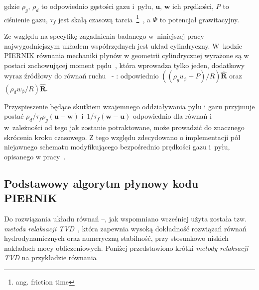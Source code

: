 \noindent gdzie $\rho_g$, $\rho_d$ to odpowiednio gęstości gazu i~pyłu,
$\mathbf{u}$, $\mathbf{w}$ ich prędkości, $P$ to ciśnienie gazu, $\tau_f$ jest
skalą czasową tarcia~\footnote{ang. friction time}~, a $\Phi$ to
potencjał grawitacyjny.

\par Ze względu na specyfikę zagadnienia badanego w~niniejszej pracy
najwygodniejszym układem współrzędnych jest układ cylindryczny. W~kodzie PIERNIK
równania mechaniki płynów w geometrii cylindrycznej wyrażone są w postaci
zachowującej moment pędu~\cite{M07,SO10}, która wprowadza tylko jeden, dodatkowy
wyraz źródłowy do równań ruchu~ - : odpowiednio
$\left((\rho_g u_\phi + P) / R\right)\mathbf{\hat{R}}$ oraz $(\rho_d w_\phi / R)
\mathbf{\hat{R}}$.
%
\par Przyspieszenie będące skutkiem wzajemnego oddziaływania pyłu i gazu
przyjmuje postać $\rho_d/\tau_f\rho_g(\mathbf{u}-\mathbf{w})$
i~$1/\tau_f(\mathbf{w}-\mathbf{u})$ odpowiednio dla równań 
i~ w~zależności od tego jak zostanie potraktowane, może prowadzić do
znacznego skrócenia kroku czasowego. Z tego względu zdecydowano o implementacji
pół niejawnego schematu modyfikującego bezpośrednio prędkości gazu i~pyłu,
opisanego w pracy~\cite{TB09}.

%

\subsection{Podstawowy algorytm płynowy kodu PIERNIK}
Do rozwiązania układu równań --, jak wspomniano wcześniej
użyta została tzw. \textit{metoda relaksacji TVD}~\cite{jin-xin-95}, która
zapewnia wysoką dokładność rozwiązań równań hydrodynamicznych oraz numeryczną
stabilność, przy stosunkowo niskich nakładach mocy obliczeniowych. Poniżej
przedstawiono krótki \textit{metody relaksacji TVD} na przykładzie równania

